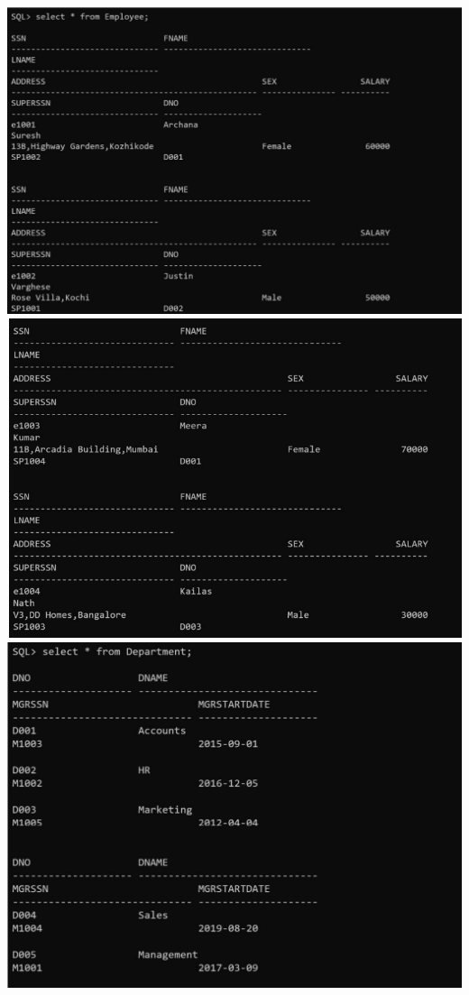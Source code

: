 \documentclass[a4paper,12pt]{report}
\begin{document}
\includegraphics[scale=0.8]{CURSOR1.png}
\includegraphics[scale=0.8]{CURSOR2.1.png}
\includegraphics[scale=0.8]{CURSOR2.2.png}
\end{document}
